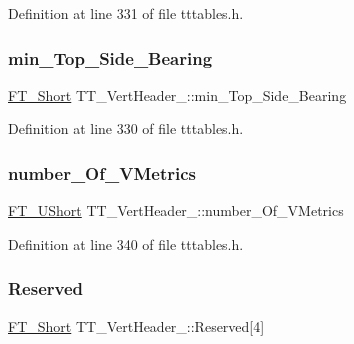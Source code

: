 Definition at line 331 of file tttables.\+h.

\mbox{\label{struct_t_t___vert_header___a10d78594a56f0966ae1d7b60138fbec2}} 
\subsubsection{\texorpdfstring{min\_Top\_Side\_Bearing}{min\_Top\_Side\_Bearing}}
{\footnotesize\ttfamily \mbox{\hyperlink{fttypes_8h_aa7279be89046a2563cd3d4d6651fbdcf}{F\+T\+\_\+\+Short}} T\+T\+\_\+\+Vert\+Header\+\_\+\+::min\+\_\+\+Top\+\_\+\+Side\+\_\+\+Bearing}



Definition at line 330 of file tttables.\+h.

\mbox{\label{struct_t_t___vert_header___a4ca6fe9cdd12fbc9a1129c4fbf6bddd1}} 
\subsubsection{\texorpdfstring{number\_Of\_VMetrics}{number\_Of\_VMetrics}}
{\footnotesize\ttfamily \mbox{\hyperlink{fttypes_8h_a937f6c17cf5ffd09086d8610c37b9f58}{F\+T\+\_\+\+U\+Short}} T\+T\+\_\+\+Vert\+Header\+\_\+\+::number\+\_\+\+Of\+\_\+\+V\+Metrics}



Definition at line 340 of file tttables.\+h.

\mbox{\label{struct_t_t___vert_header___a54930b56bb8be0a8eb22753a9242fc5f}} 
\subsubsection{\texorpdfstring{Reserved}{Reserved}}
{\footnotesize\ttfamily \mbox{\hyperlink{fttypes_8h_aa7279be89046a2563cd3d4d6651fbdcf}{F\+T\+\_\+\+Short}} T\+T\+\_\+\+Vert\+Header\+\_\+\+::\+Reserved\mbox{[}4\mbox{]}}



